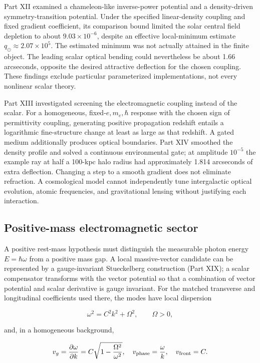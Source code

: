 \documentclass[
  11pt,
  twoside]{article}
\begin{document}
Part XII examined a chameleon-like inverse-power potential and a
density-driven symmetry-transition potential. Under the specified
linear-density coupling and fixed gradient coefficient, its comparison
bound limited the solar central field depletion to about
\(9.03\times10^{-6}\), despite an effective local-minimum estimate
\(q_\odot\approx2.07\times10^5\). The estimated minimum was not actually
attained in the finite object. The leading scalar optical bending could
nevertheless be about 1.66 arcseconds, opposite the desired attractive
deflection for the chosen coupling. These findings exclude particular
parameterized implementations, not every nonlinear scalar theory.

Part XIII investigated screening the electromagnetic coupling instead of
the scalar. For a homogeneous, fixed-\(e,m_e,\hbar\) response with the
chosen sign of permittivity coupling, generating positive propagation
redshift entails a logarithmic fine-structure change at least as large
as that redshift. A gated medium additionally produces optical
boundaries. Part XIV smoothed the density profile and solved a
continuous environmental gate; at amplitude \(10^{-5}\) the example ray
at half a 100-kpc halo radius had approximately 1.814 arcseconds of
extra deflection. Changing a step to a smooth gradient does not
eliminate refraction. A cosmological model cannot independently tune
intergalactic optical evolution, atomic frequencies, and gravitational
lensing without justifying each interaction.

\subsection{Positive-mass electromagnetic
sector}\label{positive-mass-electromagnetic-sector}

A positive rest-mass hypothesis must distinguish the measurable photon
energy \(E=\hbar\omega\) from a positive mass gap. A local
massive-vector candidate can be represented by a gauge-invariant
Stueckelberg construction (Part XIX); a scalar compensator transforms
with the vector potential so that a combination of vector potential and
scalar derivative is gauge invariant. For the matched transverse and
longitudinal coefficients used there, the modes have local dispersion

\[\omega^2=C^2 k^2+\Omega^2,\qquad \Omega>0,\]

and, in a homogeneous background,

\[v_g=\frac{\partial\omega}{\partial k}=C\sqrt{1-\frac{\Omega^2}{\omega^2}},\quad v_{\rm phase}=\frac{\omega}{k},\quad v_{\rm front}=C.\]
\end{document}

